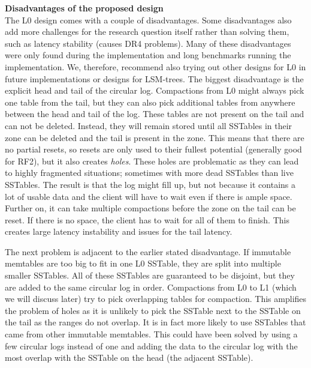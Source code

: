 \textbf{Disadvantages of the proposed design}\\
The L0 design comes with a couple of disadvantages. Some disadvantages also add more challenges for the research question itself rather than solving them, such as latency stability (causes DR4 problems). Many of these disadvantages were only found during the implementation and long benchmarks running the implementation. We, therefore, recommend also trying out other designs for L0 in future implementations or designs for LSM-trees. The biggest disadvantage is the explicit head and tail of the circular log. Compactions from L0 might always pick one table from the tail, but they can also pick additional tables from anywhere between the head and tail of the log. These tables are not present on the tail and can not be deleted. Instead, they will remain stored until all SSTables in their zone can be deleted and the tail is present in the zone. This means that there are no partial resets, so resets are only used to their fullest potential (generally good for RF2), but it also creates \textit{holes}. These holes are problematic as they can lead to highly fragmented situations; sometimes with more dead SSTables than live SSTables. The result is that the log might fill up, but not because it contains a lot of usable data and the client will have to wait even if there is ample space. Further on, it can take multiple compactions before the zone on the tail can be reset. If there is no space, the client has to wait for all of them to finish. This creates large latency instability and issues for the tail latency.

The next problem is adjacent to the earlier stated disadvantage. If immutable memtables are too big to fit in one L0 SSTable, they are split into multiple smaller SSTables. All of these SSTables are guaranteed to be disjoint, but they are added to the same circular log in order. Compactions from L0 to L1 (which we will discuss later) try to pick overlapping tables for compaction. This amplifies the problem of holes as it is unlikely to pick the SSTable next to the SSTable on the tail as the ranges do not overlap. It is in fact more likely to use SSTables that came from other immutable memtables. This could have been solved by using a few circular logs instead of one and adding the data to the circular log with the most overlap with the SSTable on the head (the adjacent SSTable).

